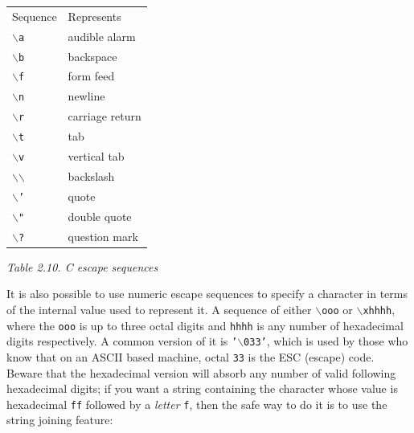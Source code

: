    \begin{tabular}{lp{\textwidth}}
     Sequence & Represents
    \\

     \texttt{$\backslash$a} & audible alarm
    \\

     \texttt{$\backslash$b} & backspace
    \\

     \texttt{$\backslash$f} & form feed
    \\

     \texttt{$\backslash$n} & newline
    \\

     \texttt{$\backslash$r} & carriage return
    \\

     \texttt{$\backslash$t} & tab
    \\

     \texttt{$\backslash$v} & vertical tab
    \\

     \texttt{$\backslash$$\backslash$} & backslash
    \\

     \texttt{$\backslash$'} & quote
    \\

     \texttt{$\backslash$"} & double quote
    \\

     \texttt{$\backslash$?} & question mark
    \\
\end{tabular}

\begin{center}\textit{Table 2.10. C escape sequences}\end{center}


   It is also possible to use numeric escape sequences to specify a
    character in terms of the internal value used to represent it. A sequence
    of either \texttt{$\backslash$ooo} or \texttt{$\backslash$xhhhh}, where
    the \texttt{ooo} is up to three octal digits
    and \texttt{hhhh} is any number of hexadecimal digits
    respectively. A common version of it is \texttt{'$\backslash$033'}, which is used
    by those who know that on an ASCII based machine,
    octal \texttt{33} is the ESC (escape) code. Beware that the
    hexadecimal version will absorb any number of valid following hexadecimal
    digits; if you want a string containing the character whose value is
    hexadecimal \texttt{ff} followed by a
    \textit{letter} \texttt{f}, then the safe way to do it is to use
    the string joining feature:



